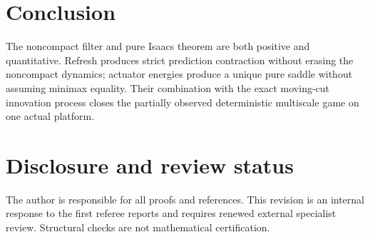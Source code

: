 \documentclass[11pt,reqno]{amsart}
\theoremstyle{definition}
\theoremstyle{remark}
\begin{document}
\section{Conclusion}

The noncompact filter and pure Isaacs theorem are both positive and
quantitative.  Refresh produces strict prediction contraction without erasing
the noncompact dynamics; actuator energies produce a unique pure saddle
without assuming minimax equality.  Their combination with the exact
moving-cut innovation process closes the partially observed deterministic
multiscale game on one actual platform.

\section*{Disclosure and review status}
The author is responsible for all proofs and references.  This revision is an
internal response to the first referee reports and requires renewed external
specialist review.  Structural checks are not mathematical certification.



\end{document}
